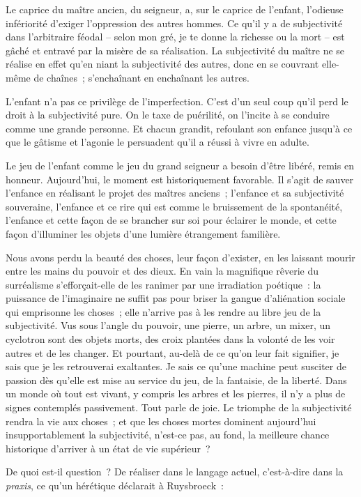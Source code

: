 \documentclass[french,twoside]{book} %
\begin{document}
Le caprice du maître ancien, du seigneur, a, sur le caprice de l’enfant, l’odieuse infériorité d’exiger l’oppression des autres hommes. Ce qu’il y a de subjectivité dans l’arbitraire féodal – selon mon gré, je te donne la richesse ou la mort – est gâché et entravé par la misère de sa réalisation. La subjectivité du maître ne se réalise en effet qu’en niant la subjectivité des autres, donc en se couvrant elle-même de chaînes ; s’enchaînant en enchaînant les autres.\par
L’enfant n’a pas ce privilège de l’imperfection. C’est d’un seul coup qu’il perd le droit à la subjectivité pure. On le taxe de puérilité, on l’incite à se conduire comme une grande personne. Et chacun grandit, refoulant son enfance jusqu’à ce que le gâtisme et l’agonie le persuadent qu’il a réussi à vivre en adulte.\par
Le jeu de l’enfant comme le jeu du grand seigneur a besoin d’être libéré, remis en honneur. Aujourd’hui, le moment est historiquement favorable. Il s’agit de sauver l’enfance en réalisant le projet des maîtres anciens ; l’enfance et sa subjectivité souveraine, l’enfance et ce rire qui est comme le bruissement de la spontanéité, l’enfance et cette façon de se brancher sur soi pour éclairer le monde, et cette façon d’illuminer les objets d’une lumière étrangement familière.\par
Nous avons perdu la beauté des choses, leur façon d’exister, en les laissant mourir entre les mains du pouvoir et des dieux. En vain la magnifique rêverie du surréalisme s’efforçait-elle de les ranimer par une irradiation poétique : la puissance de l’imaginaire ne suffit pas pour briser la gangue d’aliénation sociale qui emprisonne les choses ; elle n’arrive pas à les rendre au libre jeu de la subjectivité. Vus sous l’angle du pouvoir, une pierre, un arbre, un mixer, un cyclotron sont des objets morts, des croix plantées dans la volonté de les voir autres et de les changer. Et pourtant, au-delà de ce qu’on leur fait signifier, je sais que je les retrouverai exaltantes. Je sais ce qu’une machine peut susciter de passion dès qu’elle est mise au service du jeu, de la fantaisie, de la liberté. Dans un monde où tout est vivant, y compris les arbres et les pierres, il n’y a plus de signes contemplés passivement. Tout parle de joie. Le triomphe de la subjectivité rendra la vie aux choses ; et que les choses mortes dominent aujourd’hui insupportablement la subjectivité, n’est-ce pas, au fond, la meilleure chance historique d’arriver à un état de vie supérieur ?\par
De quoi est-il question ? De réaliser dans le langage actuel, c’est-à-dire dans la \emph{praxis}, ce qu’un hérétique déclarait à Ruysbroeck :\par
\end{document}
